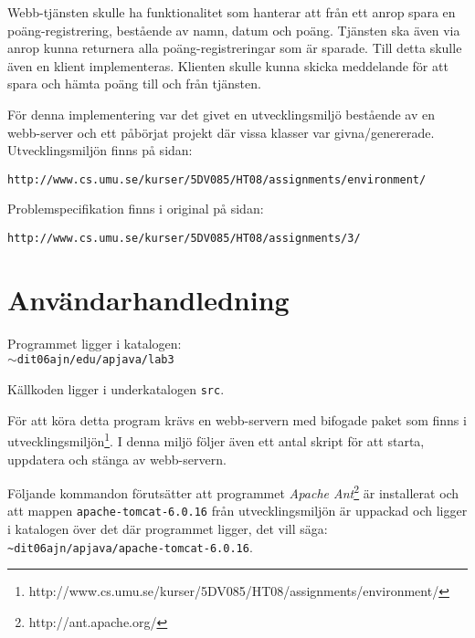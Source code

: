 \documentclass[a4paper, 12pt]{article}
\def\pathtocode{$\sim$dit06ajn/edu/apjava/lab3}
\begin{document}
Webb-tjänsten skulle ha funktionalitet som hanterar att från ett anrop
spara en poäng-registrering, bestående av namn, datum och
poäng. Tjänsten ska även via anrop kunna returnera alla
poäng-registreringar som är sparade. Till detta skulle även en klient
implementeras. Klienten skulle kunna skicka meddelande för att spara
och hämta poäng till och från tjänsten.

För denna implementering var det givet en utvecklingsmiljö bestående
av en webb-server och ett påbörjat projekt där vissa klasser var
givna/genererade. Utvecklingsmiljön finns på sidan:\\
\begin{footnotesize}
\verb!http://www.cs.umu.se/kurser/5DV085/HT08/assignments/environment/!
\end{footnotesize}

Problemspecifikation finns i original på sidan:\\
\begin{footnotesize}
\verb!http://www.cs.umu.se/kurser/5DV085/HT08/assignments/3/!
\end{footnotesize}

\section{Användarhandledning}\label{Anvandarhandledning}

Programmet ligger i katalogen:\\
\texttt{\pathtocode}

Källkoden ligger i underkatalogen \verb!src!.

För att köra detta program krävs en webb-servern med bifogade paket
som finns i
utvecklingsmiljön\footnote{http://www.cs.umu.se/kurser/5DV085/HT08/assignments/environment/}.
I denna miljö följer även ett antal skript för att starta,
uppdatera och stänga av webb-servern.

Följande kommandon förutsätter att programmet \textit{Apache
  Ant}\footnote{http://ant.apache.org/} är installerat och att mappen
\verb!apache-tomcat-6.0.16!  från utvecklingsmiljön är uppackad och
ligger i katalogen över det där programmet ligger, det vill säga:
\verb!~dit06ajn/apjava/apache-tomcat-6.0.16!.
\end{document}
